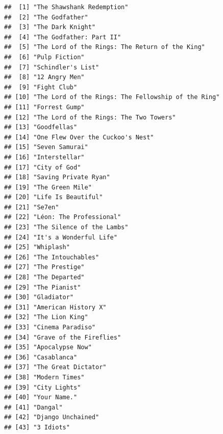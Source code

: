 \documentclass[]{book}
\begin{document}
\begin{verbatim}
##  [1] "The Shawshank Redemption"                         
##  [2] "The Godfather"                                    
##  [3] "The Dark Knight"                                  
##  [4] "The Godfather: Part II"                           
##  [5] "The Lord of the Rings: The Return of the King"    
##  [6] "Pulp Fiction"                                     
##  [7] "Schindler's List"                                 
##  [8] "12 Angry Men"                                     
##  [9] "Fight Club"                                       
## [10] "The Lord of the Rings: The Fellowship of the Ring"
## [11] "Forrest Gump"                                     
## [12] "The Lord of the Rings: The Two Towers"            
## [13] "Goodfellas"                                       
## [14] "One Flew Over the Cuckoo's Nest"                  
## [15] "Seven Samurai"                                    
## [16] "Interstellar"                                     
## [17] "City of God"                                      
## [18] "Saving Private Ryan"                              
## [19] "The Green Mile"                                   
## [20] "Life Is Beautiful"                                
## [21] "Se7en"                                            
## [22] "Léon: The Professional"                           
## [23] "The Silence of the Lambs"                         
## [24] "It's a Wonderful Life"                            
## [25] "Whiplash"                                         
## [26] "The Intouchables"                                 
## [27] "The Prestige"                                     
## [28] "The Departed"                                     
## [29] "The Pianist"                                      
## [30] "Gladiator"                                        
## [31] "American History X"                               
## [32] "The Lion King"                                    
## [33] "Cinema Paradiso"                                  
## [34] "Grave of the Fireflies"                           
## [35] "Apocalypse Now"                                   
## [36] "Casablanca"                                       
## [37] "The Great Dictator"                               
## [38] "Modern Times"                                     
## [39] "City Lights"                                      
## [40] "Your Name."                                       
## [41] "Dangal"                                           
## [42] "Django Unchained"                                 
## [43] "3 Idiots"                                         

\end{verbatim}
\end{document}
